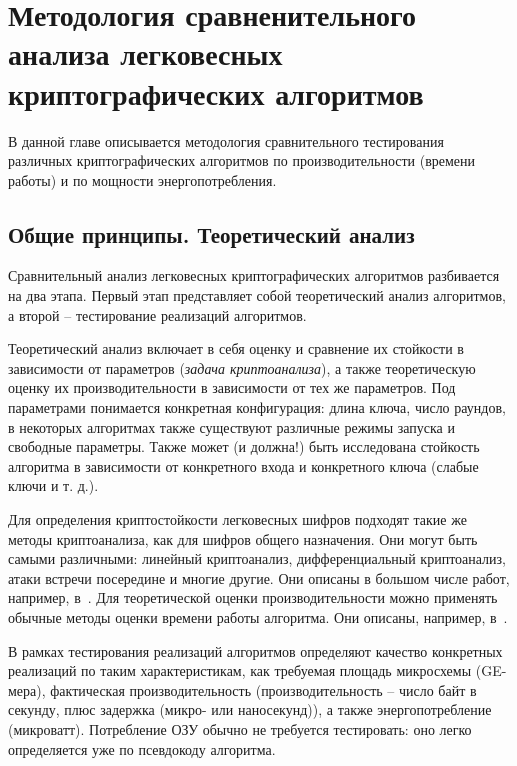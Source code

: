 \chapter{Методология сравненительного анализа легковесных криптографических алгоритмов} \label{ch3}

В данной главе описывается методология сравнительного тестирования различных криптографических алгоритмов по производительности (времени работы) и по мощности энергопотребления.
	
\section{Общие принципы. Теоретический анализ} \label{ch3:sec1}

Сравнительный анализ легковесных криптографических алгоритмов разбивается на два этапа. Первый этап представляет собой теоретический анализ алгоритмов, а второй – тестирование реализаций алгоритмов.

Теоретический анализ включает в себя оценку и сравнение их стойкости в зависимости от параметров (\textit{задача криптоанализа}), а также теоретическую оценку их производительности в зависимости от тех же параметров. Под параметрами понимается конкретная конфигурация: длина ключа, число раундов, в некоторых алгоритмах также существуют различные режимы запуска и свободные параметры. Также может (и должна!) быть исследована стойкость алгоритма в зависимости от конкретного входа и конкретного ключа (слабые ключи и т. д.). 

Для определения криптостойкости легковесных шифров подходят такие же методы криптоанализа, как для шифров общего назначения. Они могут быть самыми различными: линейный криптоанализ, дифференциальный криптоанализ, атаки встречи посередине и многие другие. Они описаны в большом числе работ, например, в~\cite{src53,src54,src55,src56}. Для теоретической оценки производительности можно применять обычные методы оценки времени работы алгоритма. Они описаны, например, в~\cite{src57}.

В рамках тестирования реализаций алгоритмов определяют качество конкретных реализаций по таким характеристикам, как требуемая площадь микросхемы (GE-мера), фактическая производительность (производительность – число байт в секунду, плюс задержка (микро- или наносекунд)), а также энергопотребление (микроватт). Потребление ОЗУ обычно не требуется тестировать: оно легко определяется уже по псевдокоду алгоритма.

